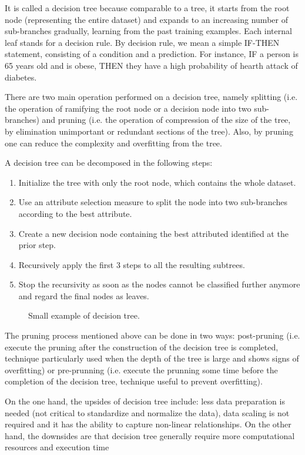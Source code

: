 It is called a decision tree because comparable to a tree, it starts from the root node (representing the entire dataset) and expands to an increasing number of sub-branches gradually, learning from the past training examples. Each internal leaf stands for a decision rule. By decision rule, we mean a simple IF-THEN statement, consisting of a condition and a prediction. For instance, IF a person is 65 years old and is obese, THEN they have a high probability of hearth attack of diabetes.

There are two main operation performed on a decision tree, namely splitting (i.e. the operation of ramifying the root node or a decision node into two sub-branches) and pruning (i.e. the operation of compression of the size of the tree, by elimination unimportant or redundant sections of the tree). Also, by pruning one can reduce the complexity and overfitting from the tree.

A decision tree can be decomposed in the following steps:
\begin{enumerate}
  \item Initialize the tree with only the root node, which contains the whole dataset.
  \item Use an attribute selection measure to split the node into two sub-branches according to the best attribute.
  \item Create a new decision node containing the best attributed identified at the prior step.
  \item Recursively apply the first 3 steps to all the resulting subtrees.
  \item Stop the recursivity as soon as the nodes cannot be classified further anymore and regard the final nodes as leaves.
\end{enumerate}

\begin{figure}[h]
  \centering
  \caption{Small example of decision tree.}
\end{figure}

The pruning process mentioned above can be done in two ways: post-pruning (i.e. execute the pruning after the construction of the decision tree is completed, technique particularly used when the depth of the tree is large and shows signs of overfitting) or pre-prunning (i.e. execute the prunning some time before the completion of the decision tree, technique useful to prevent overfitting).

On the one hand, the upsides of decision tree include: less data preparation is needed (not critical to standardize and normalize the data), data scaling is not required and it has the ability to capture non-linear relationships. On the other hand, the downsides are that decision tree generally require more computational resources and execution time

